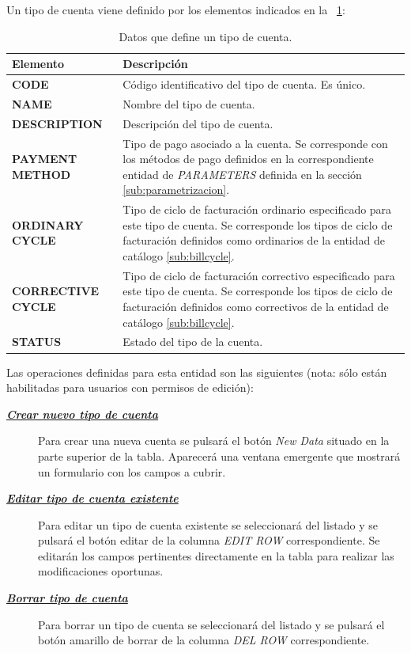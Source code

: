 Un tipo de cuenta viene definido por los elementos indicados en la \tablename~\ref{tab:tipo-cuenta}:



\begin{table}[H]
  \centering
  \setlength{\leftmargini}{0.4cm}
  \resizebox{14cm}{!} {
  \begin{tabular}{|m{4cm} m{11cm}|}
  \rowcolor{udcpink!25}
  \hline
  	\textbf{Elemento} & \textbf{Descripción} \\\hline
	\textbf{CODE} & Código identificativo del tipo de cuenta. Es único.   \\
	\textbf{NAME} & Nombre del tipo de cuenta. \\
	\textbf{DESCRIPTION} & Descripción del tipo de cuenta. \\	
	\textbf{PAYMENT METHOD} & Tipo de pago asociado a la cuenta. Se corresponde con los métodos de pago definidos en la correspondiente entidad de \emph{PARAMETERS} definida en la sección \ref{sub:parametrizacion}. \\	
	\textbf{ORDINARY CYCLE} & Tipo de ciclo de facturación ordinario especificado para este tipo de cuenta. Se corresponde los tipos de ciclo de facturación definidos como ordinarios de la entidad de catálogo \ref{sub:billcycle}. \\	 		\textbf{CORRECTIVE CYCLE} & Tipo de ciclo de facturación correctivo especificado para este tipo de cuenta. Se corresponde los tipos de ciclo de facturación definidos como correctivos de la entidad de catálogo \ref{sub:billcycle}. \\	
	\textbf{STATUS} & Estado del tipo de la cuenta.
	\\\hline
  \end{tabular}
  } %
  \caption{Datos que define un tipo de cuenta.}
  \label{tab:tipo-cuenta}
\end{table}

Las operaciones definidas para esta entidad son las siguientes (nota: sólo están habilitadas para usuarios con permisos de edición):
\begin{description}
\item[\underline{\textsl{\textbf{Crear nuevo tipo de cuenta}}}] Para crear una nueva cuenta se pulsará el botón \textit{New Data} situado en la parte superior de la tabla. Aparecerá una ventana emergente que mostrará un formulario con los campos a cubrir.

\item[\underline{\textsl{\textbf{Editar tipo de cuenta existente}}}] Para editar un tipo de cuenta existente se seleccionará del listado y se pulsará el botón editar de la columna \textit{EDIT ROW} correspondiente. Se editarán los campos pertinentes directamente en la tabla para realizar las modificaciones oportunas.

\item[\underline{\textsl{\textbf{Borrar tipo de cuenta}}}] Para borrar un tipo de cuenta se seleccionará del listado y se pulsará el botón amarillo de borrar de la columna \textit{DEL ROW} correspondiente.
\end{description}

